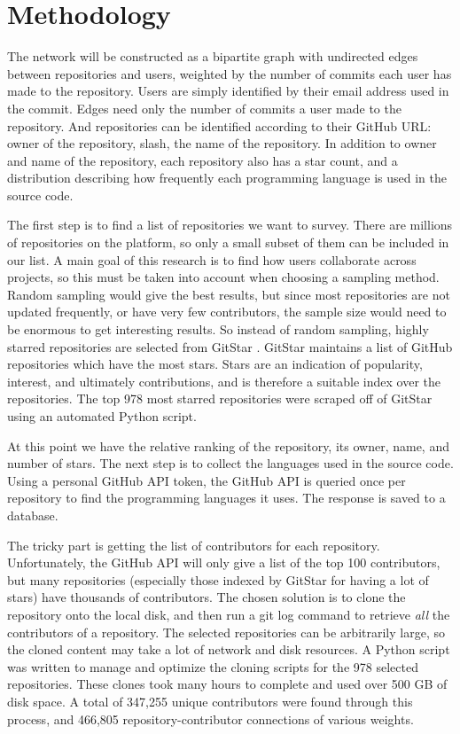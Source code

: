 \documentclass[11pt]{article}
\begin{document}
\section{Methodology}
\label{sec:methodology}
The network will be constructed as a bipartite graph with undirected edges between repositories and users, weighted by the number of commits each user has made to the repository. Users are simply identified by their email address used in the commit. Edges need only the number of commits a user made to the repository. And repositories can be identified according to their GitHub URL: owner of the repository, slash, the name of the repository. In addition to owner and name of the repository, each repository also has a star count, and a distribution describing how frequently each programming language is used in the source code.

The first step is to find a list of repositories we want to survey. There are millions of repositories on the platform, so only a small subset of them can be included in our list. A main goal of this research is to find how users collaborate across projects, so this must be taken into account when choosing a sampling method. Random sampling would give the best results, but since most repositories are not updated frequently, or have very few contributors, the sample size would need to be enormous to get interesting results. So instead of random sampling, highly starred repositories are selected from GitStar \cite{gitstar}. GitStar maintains a list of GitHub repositories which have the most stars. Stars are an indication of popularity, interest, and ultimately contributions, and is therefore a suitable index over the repositories. The top 978 most starred repositories were scraped off of GitStar using an automated Python script.

At this point we have the relative ranking of the repository, its owner, name, and number of stars. The next step is to collect the languages used in the source code. Using a personal GitHub API token, the GitHub API is queried once per repository to find the programming languages it uses. The response is saved to a database.

The tricky part is getting the list of contributors for each repository. Unfortunately, the GitHub API will only give a list of the top 100 contributors, but many repositories (especially those indexed by GitStar for having a lot of stars) have thousands of contributors. The chosen solution is to clone the repository onto the local disk, and then run a git log command to retrieve \emph{all} the contributors of a repository. The selected repositories can be arbitrarily large, so the cloned content may take a lot of network and disk resources. A Python script was written to manage and optimize the cloning scripts for the 978 selected repositories. These clones took many hours to complete and used over 500 GB of disk space. A total of 347,255 unique contributors were found through this process, and 466,805 repository-contributor connections of various weights.
\end{document}
